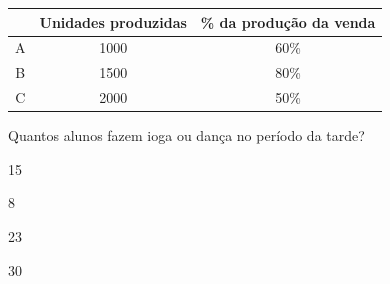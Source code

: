 \begin{escolha}
\begin{boxmedio}
\begin{boxmedio}
{\begin{boxpeq}
\begin{boxpeq}
{\begin{boxpeq}
\begin{boxmedio}
\begin{boxmedio}
\begin{boxpeq}
\begin{boxmedio}
\begin{boxpeq}
\begin{boxpeq}
\begin{boxpeq}
\begin{boxpeq}
\begin{boxmedio}
{\begin{boxmedio}
\begin{boxmedio}
\begin{boxpeq}
\begin{boxmedio}
\begin{boxpeq}
\begin{boxpeq}
\begin{boxpeq}
\begin{escolha}
{\begin{boxmedio}
\begin{boxpeq}
\begin{boxpeq}
\begin{boxpeq}
\begin{boxpeq}
\begin{boxpeq}
\begin{boxmedio}
\begin{boxpeq}
\begin{boxpeq}
\begin{boxpeq}
{\begin{boxpeq}
\begin{boxmedio}
\begin{boxpeq}
\begin{boxpeq}
\begin{boxpeq}
{\begin{boxpeq}
\begin{boxmedio}
{\begin{boxpeq}
\begin{boxpeq}
\begin{boxmedio}
\begin{boxmedio}
\begin{boxpeq}
\begin{boxpeq}
{\begin{boxpeq}
\begin{boxpeq}
\begin{boxpeq}
\begin{boxpeq}
\begin{boxpeq}
\begin{escolha}
\begin{escolha}
{\begin{boxmedio}
\begin{boxpeq}
\begin{q°}
\begin{boxmedio}
\begin{boxpeq}
\begin{boxpeq}
\begin{boxmedio}
\begin{boxmedio}
\begin{boxmedio}
\begin{boxmedio}
\begin{table}[]
\begin{tabular}{c|c|c}
\hline
\rowcolor[HTML]{C0C0C0} 
\multicolumn{1}{|c|}{\cellcolor[HTML]{C0C0C0}\textbf{Montadora}} & \textbf{Unidades produzidas} & \multicolumn{1}{c|}{\cellcolor[HTML]{C0C0C0}\textbf{\% da produção da venda}} \\ \hline
A & 1000 & 60\% \\ \hline
B & 1500 & 80\% \\ \hline
C & 2000 & 50\% \\ \hline
\end{tabular}
\end{table}

Quantos alunos fazem ioga ou dança no período da tarde?

\begin{escolha}

  \item 15

  \item 8

  \item 23

  \item 30


\end{escolha}
\end{boxmedio}
\end{boxmedio}
\end{boxmedio}
\end{boxmedio}
\end{boxpeq}
\end{boxpeq}
\end{boxmedio}
\end{q°}
\end{boxpeq}
\end{boxmedio}}
\end{escolha}
\end{escolha}
\end{boxpeq}
\end{boxpeq}
\end{boxpeq}
\end{boxpeq}
\end{boxpeq}}
\end{boxpeq}
\end{boxpeq}
\end{boxmedio}
\end{boxmedio}
\end{boxpeq}
\end{boxpeq}}
\end{boxmedio}
\end{boxpeq}}
\end{boxpeq}
\end{boxpeq}
\end{boxpeq}
\end{boxmedio}
\end{boxpeq}}
\end{boxpeq}
\end{boxpeq}
\end{boxpeq}
\end{boxmedio}
\end{boxpeq}
\end{boxpeq}
\end{boxpeq}
\end{boxpeq}
\end{boxpeq}
\end{boxmedio}}
\end{escolha}
\end{boxpeq}
\end{boxpeq}
\end{boxpeq}
\end{boxmedio}
\end{boxpeq}
\end{boxmedio}
\end{boxmedio}}
\end{boxmedio}
\end{boxpeq}
\end{boxpeq}
\end{boxpeq}
\end{boxpeq}
\end{boxmedio}
\end{boxpeq}
\end{boxmedio}
\end{boxmedio}
\end{boxpeq}}
\end{boxpeq}
\end{boxpeq}}
\end{boxmedio}
\end{boxmedio}
\end{escolha}

